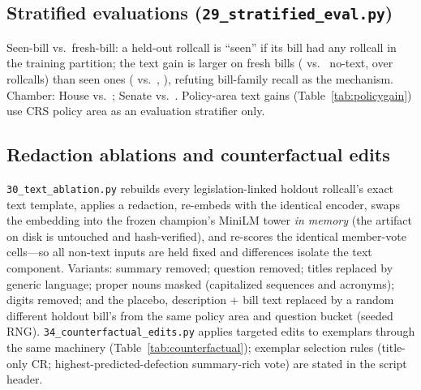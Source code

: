 \documentclass[11pt]{article}
\newcommand{\code}[1]{\texttt{#1}}
\begin{document}
\subsection{Stratified evaluations (\code{29\_stratified\_eval.py})}

Seen-bill vs.\ fresh-bill: a held-out rollcall is ``seen'' if its bill
had any rollcall in the training partition; the text gain is larger on
fresh bills (\freshLLchamp{} vs.\ \freshLLnotext{} no-text, over
\freshRC{} rollcalls) than seen ones (\seenLLchamp{} vs.\ \seenLLnotext,
\seenRC), refuting bill-family recall as the mechanism. Chamber: House
\houseLLchamp{} vs.\ \houseLLnotext; Senate \senateLLchamp{} vs.\
\senateLLnotext. Policy-area text gains (Table~\ref{tab:policygain}) use
CRS policy area as an evaluation stratifier only.

\begin{table}[tbp]
\centering
\caption{Text gain by policy area (no-text minus model log loss).}
\label{tab:policygain}
{\small }
\end{table}

\subsection{Redaction ablations and counterfactual edits}
\label{sec:ablation}

\code{30\_text\_ablation.py} rebuilds every legislation-linked holdout
rollcall's exact text template, applies a redaction, re-embeds with the
identical encoder, swaps the embedding into the frozen champion's MiniLM
tower \emph{in memory} (the artifact on disk is untouched and
hash-verified), and re-scores the identical member-vote cells---so all
non-text inputs are held fixed and differences isolate the text
component. Variants: summary removed; question removed; titles replaced
by generic language; proper nouns masked (capitalized sequences and
acronyms); digits removed; and the placebo, description + bill text
replaced by a random different holdout bill's from the same policy area
and question bucket (seeded RNG). \code{34\_counterfactual\_edits.py}
applies targeted edits to exemplars through the same machinery
(Table~\ref{tab:counterfactual}); exemplar selection rules (title-only
CR; highest-predicted-defection summary-rich vote) are stated in the
script header.

\begin{table}[tbp]
\centering
\caption{Redaction ablations through the frozen tower
(\code{30\_text\_ablation.py}).}
\label{tab:ablation}
{\small }
\end{table}
\end{document}
